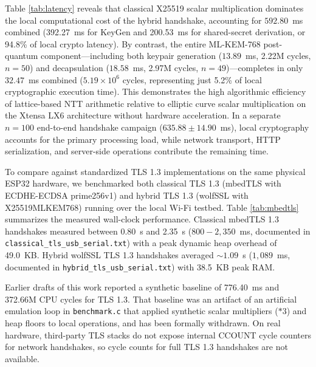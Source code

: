 \documentclass[journal, 10pt]{IEEEtran}
\begin{document}
Table \ref{tab:latency} reveals that classical X25519 scalar multiplication dominates the local computational cost of the hybrid handshake, accounting for $592.80$~ms combined (392.27~ms for KeyGen and 200.53~ms for shared-secret derivation, or 94.8\% of local crypto latency). By contrast, the entire ML-KEM-768 post-quantum component---including both keypair generation ($13.89$~ms, 2.22M cycles, $n=50$) and decapsulation ($18.58$~ms, 2.97M cycles, $n=49$)---completes in only $32.47$~ms combined ($5.19\times 10^6$ cycles, representing just 5.2\% of local cryptographic execution time). This demonstrates the high algorithmic efficiency of lattice-based NTT arithmetic relative to elliptic curve scalar multiplication on the Xtensa LX6 architecture without hardware acceleration. In a separate $n=100$ end-to-end handshake campaign ($635.88\pm 14.90$~ms), local cryptography accounts for the primary processing load, while network transport, HTTP serialization, and server-side operations contribute the remaining time.

To compare against standardized TLS 1.3 implementations on the same physical ESP32 hardware, we benchmarked both classical TLS 1.3 (mbedTLS with ECDHE-ECDSA prime256v1) and hybrid TLS 1.3 (wolfSSL with X25519MLKEM768) running over the local Wi-Fi testbed. Table \ref{tab:mbedtls} summarizes the measured wall-clock performance. Classical mbedTLS 1.3 handshakes measured between 0.80~s and 2.35~s ($800 - 2{,}350$~ms, documented in \texttt{classical\_tls\_usb\_serial.txt}) with a peak dynamic heap overhead of 49.0~KB. Hybrid wolfSSL TLS 1.3 handshakes averaged $\sim 1.09$~s ($1{,}089$~ms, documented in \texttt{hybrid\_tls\_usb\_serial.txt}) with 38.5~KB peak RAM.

Earlier drafts of this work reported a synthetic baseline of 776.40~ms and 372.66M CPU cycles for TLS 1.3. That baseline was an artifact of an artificial emulation loop in \texttt{benchmark.c} that applied synthetic scalar multipliers ($*3$) and heap floors to local operations, and has been formally withdrawn. On real hardware, third-party TLS stacks do not expose internal CCOUNT cycle counters for network handshakes, so cycle counts for full TLS 1.3 handshakes are not available.
\end{document}
